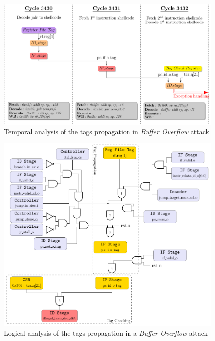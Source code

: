 \begin{frame}
    \begin{figure}
        \centering
        \includegraphics[width=.75\textwidth]{src/2_vuln_assessment/img/buffer_overflow/bufferOverflowAttack_short.pdf}
        \caption{Temporal analysis of the tags propagation in \textit{Buffer Overflow} attack}
        \label{fig:analyseTempoBufferOverflow}
    \end{figure}
\end{frame}

\begin{frame}
    \begin{figure}
        \centering
        \includegraphics[height=.85\textheight]{src/2_vuln_assessment/img/buffer_overflow/arborescence_bufferOverflow.pdf}
        \caption{Logical analysis of the tags propagation in a \textit{Buffer Overflow} attack}
        \label{fig:analyseLogiqueBufferOverflow}
    \end{figure}
\end{frame}

